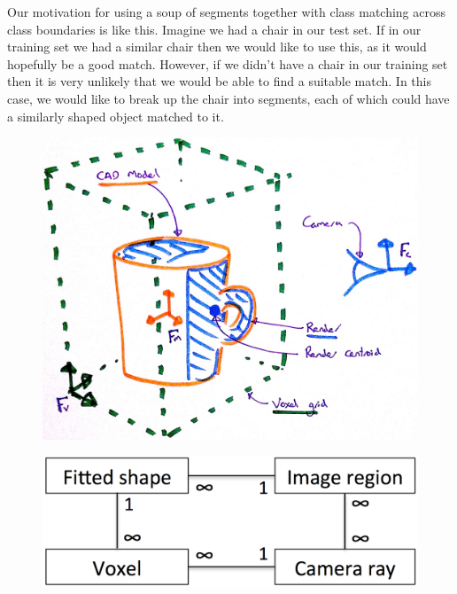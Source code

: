 \documentclass[10pt,a4paper, twocolumn]{article}
\begin{document}
Our motivation for using a soup of segments together with class matching across class boundaries is like this.
Imagine we had a chair in our test set.
If in our training set we had a similar chair then we would like to use this, as it would hopefully be a good match.
However, if we didn't have a chair in our training set then it is very unlikely that we would be able to find a suitable match.
In this case, we would like to break up the chair into segments, each of which could have a similarly shaped object matched to it.


\begin{figure}
	\centering%
	\includegraphics[width=1.0\linewidth]{voxel_coordinates}%
	\label{fig:voxel_coordinates}%
\end{figure}

\begin{figure}
	\centering%
	\includegraphics[width=1.0\linewidth]{relational}%
	\label{fig:relational}%
\end{figure}
\end{document}
